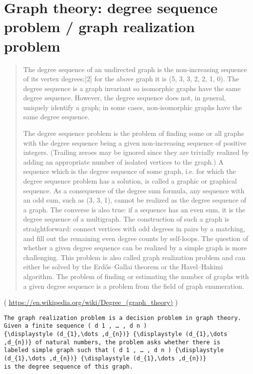 \section{Graph theory: degree sequence problem / graph realization problem}

\renewcommand{\CURPATH}{other/degree_seq}

\begin{framed}
\begin{quotation}
The degree sequence of an undirected graph is the non-increasing sequence of its vertex degrees;[2] for the above graph it is (5, 3, 3, 2, 2, 1, 0).
The degree sequence is a graph invariant so isomorphic graphs have the same degree sequence. However, the degree sequence does not, in general,
uniquely identify a graph; in some cases, non-isomorphic graphs have the same degree sequence.

The degree sequence problem is the problem of finding some or all graphs with the degree sequence being a given non-increasing sequence 
of positive integers. (Trailing zeroes may be ignored since they are trivially realized by adding an appropriate number of isolated vertices 
to the graph.) A sequence which is the degree sequence of some graph, i.e. for which the degree sequence problem has a solution, is called 
a graphic or graphical sequence. As a consequence of the degree sum formula, any sequence with an odd sum, such as (3, 3, 1), cannot be 
realized as the degree sequence of a graph. The converse is also true: if a sequence has an even sum, it is the degree sequence of a multigraph. 
The construction of such a graph is straightforward: connect vertices with odd degrees in pairs by a matching, and fill out the remaining 
even degree counts by self-loops. The question of whether a given degree sequence can be realized by a simple graph is more challenging. 
This problem is also called graph realization problem and can either be solved by the Erdős–Gallai theorem or the Havel–Hakimi algorithm.
The problem of finding or estimating the number of graphs with a given degree sequence is a problem from the field of graph enumeration. 
\end{quotation}
\end{framed}

( \url{https://en.wikipedia.org/wiki/Degree_(graph_theory)} )

\begin{lstlisting}
The graph realization problem is a decision problem in graph theory. Given a finite sequence ( d 1 , … , d n )
{\displaystyle (d_{1},\dots ,d_{n})} {\displaystyle (d_{1},\dots ,d_{n})} of natural numbers, the problem asks whether there is 
labeled simple graph such that ( d 1 , … , d n ) {\displaystyle (d_{1},\dots ,d_{n})} {\displaystyle (d_{1},\dots ,d_{n})} 
is the degree sequence of this graph. 
\end{lstlisting}


